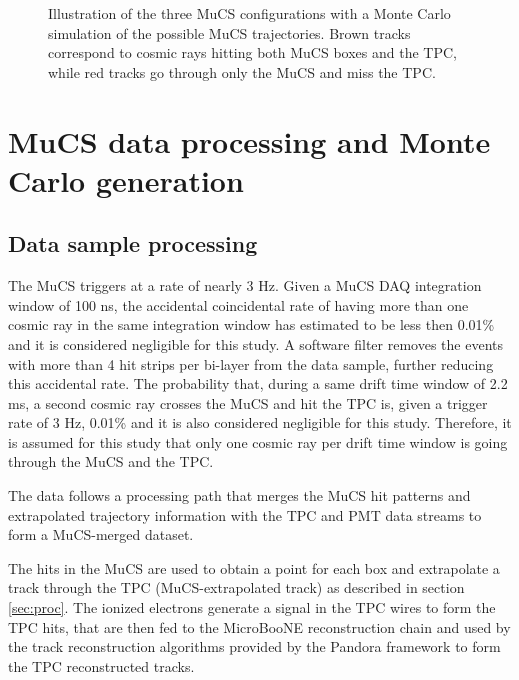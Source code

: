 \documentclass[a4paper,11pt]{article}
\begin{document}
\begin{figure}[htbp]
  \caption{Illustration of the three MuCS configurations with a Monte Carlo simulation of the possible MuCS trajectories. Brown tracks correspond to cosmic rays hitting both MuCS boxes and the TPC, while red tracks go through only the MuCS and miss the TPC.} \label{fig:mucs}
\end{figure}


\section{MuCS data processing and Monte Carlo generation}\label{sec:merging}

\subsection{Data sample processing}\label{sec:data_proc}
The MuCS triggers at a rate of nearly 3 Hz. Given a MuCS DAQ integration window of 100 ns, the accidental coincidental rate of having more than one cosmic ray in the same integration window has estimated to be less then 0.01\% and it is considered negligible for this study. A software filter removes the events with more than 4 hit strips per bi-layer from the data sample, further reducing this accidental rate.
The probability that, during a same drift time window of 2.2 ms, a second cosmic ray crosses the MuCS and hit the TPC is, given a trigger rate of 3 Hz, 0.01\% and it is also considered negligible for this study. Therefore, it is assumed for this study that only one cosmic ray per drift time window is going through the MuCS and the TPC.

The data follows a processing path that merges the MuCS hit patterns and extrapolated trajectory information with the TPC and PMT data streams to form a MuCS-merged dataset. %


The hits in the MuCS are used to obtain a point for each box and extrapolate a track through the TPC (MuCS-extrapolated track) as described in section \ref{sec:proc}. The ionized electrons generate a signal in the TPC wires to form the TPC hits, that are then fed to the MicroBooNE reconstruction chain and used by the track reconstruction algorithms provided by the Pandora framework \cite{pandora} to form the TPC reconstructed tracks.
\end{document}
